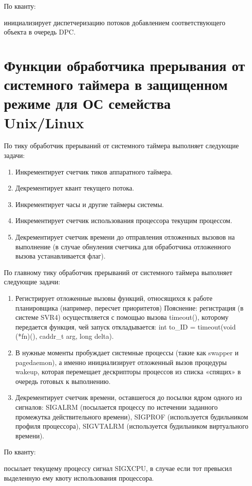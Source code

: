 \documentclass[12pt]{report}
\begin{document}
По кванту:

инициализирует диспетчеризацию потоков добавлением соответствующего объекта в очередь DPC.


\section{Функции обработчика прерывания от системного таймера в защищенном режиме для ОС семейства Unix/Linux}

По тику обработчик прерываний от системного таймера выполняет следующие задачи:
\begin{enumerate}
\item Инкрементирует счетчик тиков аппаратного таймера.
\item Декрементирует квант текущего потока.
\item Инкрементирует часы и другие таймеры системы.
\item Инкрементирует счетчик использования процессора текущим процессом.
\item Декрементирует счетчик времени до отправления отложенных вызовов на выполнение (в случае обнуления счетчика для обработчика отложенного вызова устанавливается флаг).
\end{enumerate}

По главному тику обработчик прерываний от системного таймера выполняет следующие задачи:
\begin{enumerate}
\item Регистрирует отложенные вызовы функций, относящихся к работе планировщика (например, пересчет приоритетов) Пояснение: регистрация (в системе SVR4) осуществляется с помощью вызова timeout(), которому передается функция, чей запуск откладывается: int to\_ID = timeout(void (*fn)(), caddr\_t arg, long delta).
\item В нужные моменты пробуждает системные процессы (такие как swapper и pagedaemon), а именно инициализирует отложенный вызов процедуры wakeup, которая перемещает дескрипторы процессов из списка «спящих» в очередь готовых к выполнению.
\item Декрементирует счетчик времени, оставшегося до посылки ядром одного из сигналов: SIGALRM (посылается процессу по истечении заданного промежутка действительного времени), SIGPROF (используется будильником профиля процессора), SIGVTALRM (используется будильником виртуального времени).
\end{enumerate}

По кванту: 

посылает текущему процессу сигнал SIGXCPU, в случае если тот превысил выделенную ему квоту использования процессора.
\end{document}
